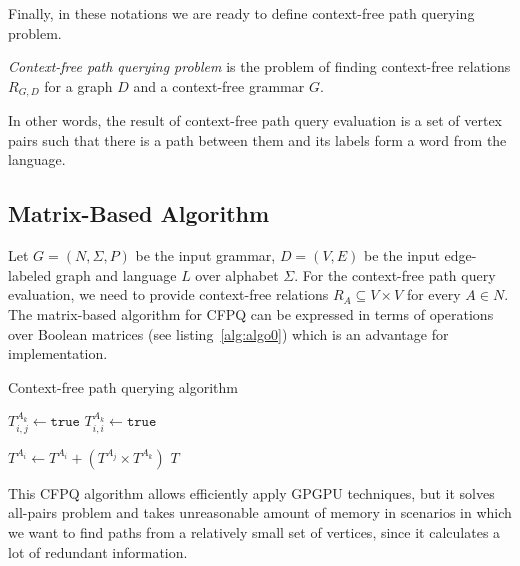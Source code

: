 Finally, in these notations we are ready to define context-free path querying problem.
\begin{definition}
    \emph{Context-free path querying problem} is the problem of finding context-free relations $R_{G, D}$ for a graph $D$ and a context-free grammar $G$.
    
    In other words, the result of context-free path query evaluation is a set of vertex pairs such that there is a path between them and its labels form a word from the language.
\end{definition} 
 
\subsection{Matrix-Based Algorithm}
Let $G = (N, \Sigma, P)$ be the input grammar, $D = (V, E)$ be the input edge-labeled graph and language $L$ over alphabet $\Sigma$. For the context-free path query evaluation, we need to provide context-free relations \mbox{$R_A \subseteq V \times V$} for every \mbox{$A \in N$}.
The matrix-based algorithm for CFPQ can be expressed in terms of operations over Boolean matrices (see listing~\ref{alg:algo0}) which is an advantage for implementation.
{\footnotesize
\begin{algorithm}
\begin{algorithmic}[1]
\caption{Context-free path querying algorithm}
\label{alg:algo0}
          {$T^{A_k}_{i,j} \gets \texttt{true}$}
    \EndFor
            {$T^{A_k}_{i,i} \gets \texttt{true}$}
        \EndFor
    \EndFor

          { $T^{A_i} \gets T^{A_i} + (T^{A_j} \times T^{A_k})$ } 
        \EndFor
    \EndWhile
\State \Return $T$
\EndFunction
\end{algorithmic}
\end{algorithm}
}

This CFPQ algorithm allows efficiently apply GPGPU techniques, but it solves all-pairs problem and takes unreasonable amount of memory in scenarios in which we want to find paths from a relatively small set of vertices, since it calculates a lot of redundant information.  
